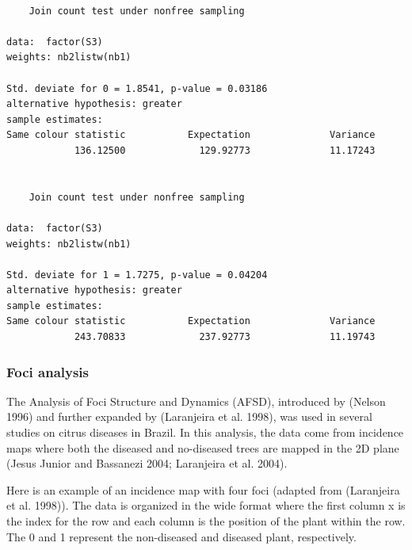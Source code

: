 \documentclass[
  letterpaper,
]{book}
\begin{document}
\begin{verbatim}

    Join count test under nonfree sampling

data:  factor(S3) 
weights: nb2listw(nb1) 

Std. deviate for 0 = 1.8541, p-value = 0.03186
alternative hypothesis: greater
sample estimates:
Same colour statistic           Expectation              Variance 
            136.12500             129.92773              11.17243 


    Join count test under nonfree sampling

data:  factor(S3) 
weights: nb2listw(nb1) 

Std. deviate for 1 = 1.7275, p-value = 0.04204
alternative hypothesis: greater
sample estimates:
Same colour statistic           Expectation              Variance 
            243.70833             237.92773              11.19743 
\end{verbatim}

\hypertarget{foci-analysis}{%
\subsubsection{Foci analysis}\label{foci-analysis}}

The Analysis of Foci Structure and Dynamics (AFSD), introduced by
(Nelson 1996) and further expanded by (Laranjeira et al. 1998), was used
in several studies on citrus diseases in Brazil. In this analysis, the
data come from incidence maps where both the diseased and no-diseased
trees are mapped in the 2D plane (Jesus Junior and Bassanezi 2004;
Laranjeira et al. 2004).

Here is an example of an incidence map with four foci (adapted from
(Laranjeira et al. 1998)). The data is organized in the wide format
where the first column x is the index for the row and each column is the
position of the plant within the row. The 0 and 1 represent the
non-diseased and diseased plant, respectively.
\end{document}
